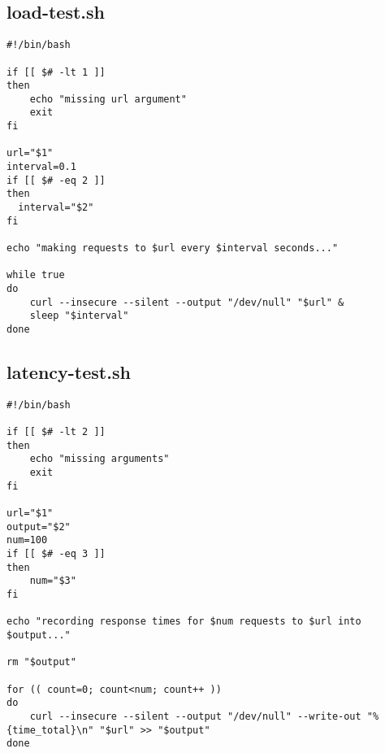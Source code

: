 \documentclass{article}
\begin{document}
\subsection{load-test.sh}
\begin{verbatim}
#!/bin/bash

if [[ $# -lt 1 ]]
then
    echo "missing url argument"
    exit
fi

url="$1"
interval=0.1
if [[ $# -eq 2 ]]
then
  interval="$2"
fi

echo "making requests to $url every $interval seconds..."

while true
do
    curl --insecure --silent --output "/dev/null" "$url" &
    sleep "$interval"
done
\end{verbatim}

\subsection{latency-test.sh}
\begin{verbatim}
#!/bin/bash

if [[ $# -lt 2 ]]
then
    echo "missing arguments"
    exit
fi

url="$1"
output="$2"
num=100
if [[ $# -eq 3 ]]
then
    num="$3"
fi

echo "recording response times for $num requests to $url into $output..."

rm "$output"

for (( count=0; count<num; count++ ))
do
    curl --insecure --silent --output "/dev/null" --write-out "%{time_total}\n" "$url" >> "$output"
done
\end{verbatim}
\end{document}
